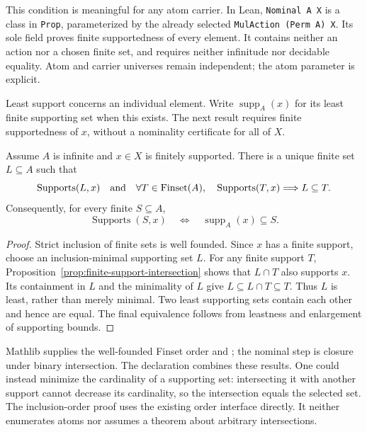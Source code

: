 This condition is meaningful for any atom carrier. In Lean,
\texttt{Nominal A X} is a class in \texttt{Prop}, parameterized by the
already selected \texttt{MulAction (Perm A) X}. Its sole field proves finite
supportedness of every element. It contains neither an action nor a chosen
finite set, and requires neither infinitude nor decidable equality. Atom and
carrier universes remain independent; the atom parameter is explicit.

Least support concerns an individual element. Write
$\operatorname{supp}_A(x)$ for its least finite supporting set when this
exists. The next result requires finite supportedness of $x$, without a
nominality certificate for all of $X$.

\begin{proposition}
\label{prop:least-support}
Assume $A$ is infinite and $x\in X$ is finitely supported. There is a unique
finite set $L\subseteq A$ such that
\[
  \operatorname{Supports}(L,x)
  \quad\text{and}\quad
  \forall T\in\operatorname{Finset}(A),\quad
  \operatorname{Supports}(T,x)\Longrightarrow L\subseteq T.
\]
Consequently, for every finite $S\subseteq A$,
\[
  \operatorname{Supports}(S,x)
  \quad\Longleftrightarrow\quad\operatorname{supp}_A(x)\subseteq S.
\]
\end{proposition}

\begin{proof}
Strict inclusion of finite sets is well founded. Since $x$ has a finite
support, choose an inclusion-minimal supporting set $L$. For any finite
support $T$, Proposition~\ref{prop:finite-support-intersection} shows that
$L\cap T$ also supports $x$. Its containment in $L$ and the minimality of
$L$ give $L\subseteq L\cap T\subseteq T$. Thus $L$ is least, rather than
merely minimal. Two least supporting sets contain each other and hence
are equal. The final equivalence follows from leastness and enlargement
of supporting bounds.
\end{proof}

Mathlib supplies the well-founded Finset order and
; the nominal step is closure under
binary intersection. The declaration
 combines these results.
One could instead minimize the cardinality of a supporting set: intersecting
it with another support cannot decrease its cardinality, so the intersection
equals the selected set. The inclusion-order proof uses the existing order
interface directly. It neither enumerates atoms nor assumes a theorem about
arbitrary intersections.

